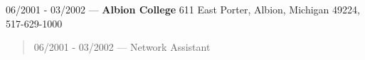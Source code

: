 06/2001 - 03/2002 --- {\bf Albion College} 611 East Porter, Albion, Michigan 49224, 517-629-1000
\begin{quote}
06/2001 - 03/2002 --- Network Assistant
\end{quote}
